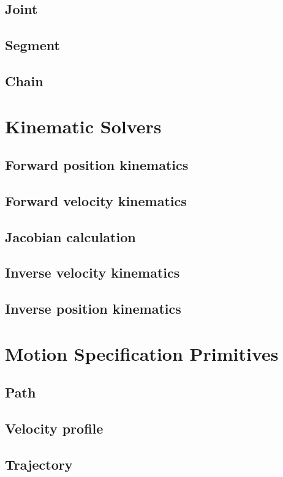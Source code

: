 \documentclass[a4paper,10pt]{report}
\begin{document}
\subsection{Joint}
\label{sec:joint}

\subsection{Segment}
\label{sec:segment}

\subsection{Chain}
\label{sec:chain}

\section{Kinematic Solvers}
\label{sec:kinematic-solvers}

\subsection{Forward position kinematics}
\label{sec:forw-posit-kinem}

\subsection{Forward velocity kinematics}
\label{sec:forw-veloc-kinem}

\subsection{Jacobian calculation}
\label{sec:jacobian-calculation}

\subsection{Inverse velocity kinematics}
\label{sec:inverse-veloc-kinem}

\subsection{Inverse position kinematics}
\label{sec:inverse-posit-kinem}

\section{Motion Specification Primitives}
\label{sec:moti-spec-prim}

\subsection{Path}
\label{sec:path}

\subsection{Velocity profile}
\label{sec:velocity-profile}

\subsection{Trajectory}
\label{sec:trajectory}
\end{document}
